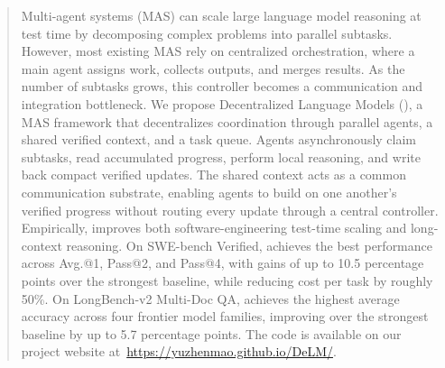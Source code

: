 \begin{abstract}
Multi-agent systems (MAS) can scale large language model reasoning at test time by decomposing complex problems into parallel subtasks. However, most existing MAS rely on centralized orchestration, where a main agent assigns work, collects outputs, and merges results. As the number of subtasks grows, this controller becomes a communication and integration bottleneck. We propose Decentralized Language Models (\toolName{}), a MAS framework that decentralizes coordination through parallel agents, a shared verified context, and a task queue. Agents asynchronously claim subtasks, read accumulated progress, perform local reasoning, and write back compact verified updates. The shared context acts as a common communication substrate, enabling agents to build on one another’s verified progress without routing every update through a central controller. Empirically, \toolName{} improves both software-engineering test-time scaling and long-context reasoning. On SWE-bench Verified, \toolName{} achieves the best performance across Avg.@1, Pass@2, and Pass@4, with gains of up to 10.5 percentage points over the strongest baseline, while reducing cost per task by roughly 50\%. On LongBench-v2 Multi-Doc QA, \toolName{} achieves the highest average accuracy across four frontier model families, improving over the strongest baseline by up to 5.7 percentage points. The code is available on our project website at~\url{https://yuzhenmao.github.io/DeLM/}.
\end{abstract}